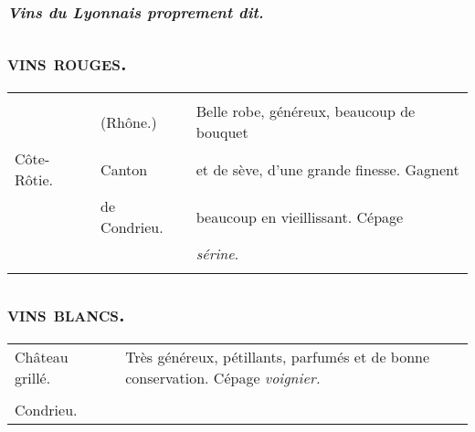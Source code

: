 \subsubsection*{\centering \textit{ Vins du Lyonnais proprement dit.}}

\subsection*{\centering \small\textsc{vins rouges.}}

\scriptsize
\begin{longtable}{m{12em}m{9em}m{13em}}                                                    
                                       &                     &                                                         \\
                                       & (Rhône.)            &  Belle robe, généreux, beaucoup de bouquet              \\
  Côte-Rôtie.                          & Canton              &  et de sève, d'une grande finesse. Gagnent              \\
                                       & de Condrieu.        &  beaucoup en vieillissant. Cépage                       \\
                                       &                     &  \textit{sérine}.                                       \\
                                       &                     &                                                         \\
\end{longtable}
\normalsize

\subsection*{\centering \small\textsc{vins blancs.}}

\scriptsize
\begin{longtable}{m{12em}m{9em}m{13em}}                                                    
  Château grillé.                      &                     &  Très généreux, pétillants, parfumés     
                                                                et de bonne conservation. Cépage \textit{voignier.}    \\
                                       &                     &                                                         \\
  Condrieu.                            &                     &                                                         \\
\end{longtable}
\normalsize

